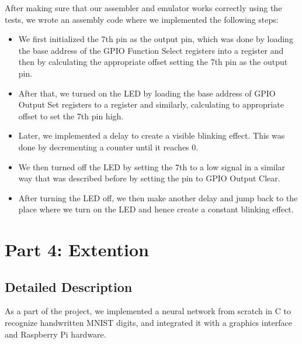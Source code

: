 \documentclass{article}
\begin{document}
After making sure that our assembler and emulator works correctly using the tests, we wrote an assembly code where we implemented the following steps:
\begin{itemize}
    \item We first initialized the 7th pin as the output pin, which was done by loading the base address of the GPIO Function Select registers into a register and then by calculating the appropriate offset setting the 7th pin as the output pin.
    \item After that, we turned on the LED by loading the base address of GPIO Output Set registers to a register and similarly, calculating to appropriate offset to set the 7th pin high.
    \item Later, we implemented a delay to create a visible blinking effect. This was done by decrementing a counter until it reaches 0.
    \item We then turned off the LED by setting the 7th to a low signal in a similar way that was described before by setting the pin to GPIO Output Clear.
    \item After turning the LED off, we then make another delay and jump back to the place where we turn on the LED and hence create a constant blinking effect.
\end{itemize}


\section{Part 4: Extention}
\subsection{Detailed Description}
As a part of the project, we implemented a neural network from scratch in C to recognize handwritten MNIST digits, and integrated it with a graphics interface and Raspberry Pi hardware.
\end{document}
